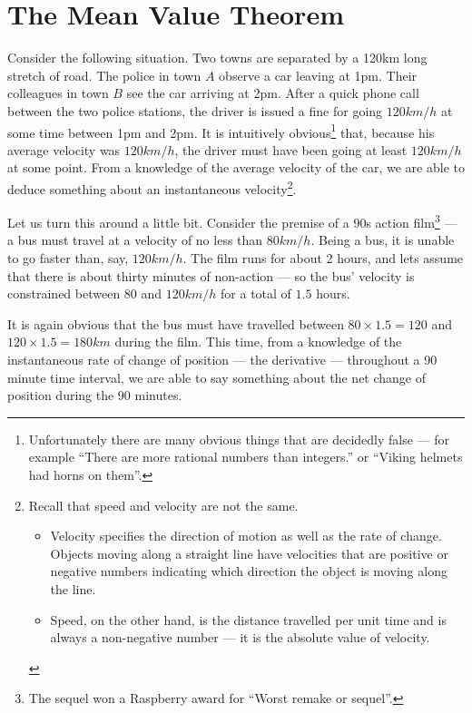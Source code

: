 \section{The Mean Value Theorem}\label{sec mvt}
Consider the following situation. Two towns are separated by a 120km long stretch of road.
The police in town $A$ observe a car leaving at 1pm. Their colleagues in town $B$ see the
car arriving at 2pm. After a quick phone call between the two police stations, the driver
is issued a fine for going $120km/h$ at some time between 1pm and 2pm. It is intuitively
obvious\footnote{Unfortunately there are many obvious things that are decidedly false ---
for example ``There are more rational numbers than integers.'' or ``Viking helmets had
horns on them''.} that, because his average velocity was $120km/h$, the driver
must have been going at least $120km/h$ at some point. From a knowledge of the
average velocity of the car, we are able to deduce something about an
instantaneous velocity\footnote{
Recall that speed and velocity are not the same.
\begin{itemize}
 \item Velocity specifies the direction of motion as well as the rate of
change. Objects moving along a straight line have velocities that are positive
or negative numbers indicating  which direction the object is moving along the
line.
 \item Speed, on the other hand, is the distance travelled per unit time and is
always a non-negative number --- it is the absolute value of velocity.
\end{itemize}
}.


Let us turn this around a little bit. Consider the premise of a 90s action
film\footnote{The sequel won a Raspberry award for ``Worst remake or sequel''.} --- a
bus must travel at a velocity of no less than $80km/h$. Being a bus, it is unable to go
faster than, say, $120km/h$. The film runs for about 2 hours, and lets assume that there
is about thirty minutes of non-action --- so the bus' velocity is constrained between
$80$ and $120km/h$ for a total of $1.5$ hours.

It is again obvious that the bus must have travelled between $80 \times 1.5 = 120$ and
$120\times 1.5 = 180km$ during the film. This time, from a knowledge of the instantaneous
rate of change of position --- the derivative --- throughout a 90 minute time
interval, we are able to say something about the net change of position during the 90
minutes.

